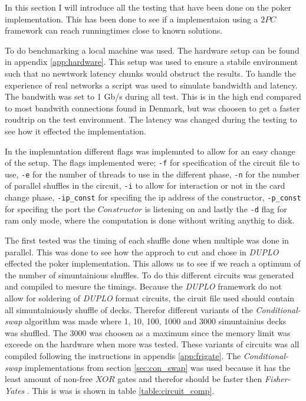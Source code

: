 \documentclass[twoside,11pt,openright]{report}
\newcommand{\FY}{\textit{Fisher-Yates} }
\newcommand{\CS}{\textit{Conditional-swap} }
\newcommand{\DUPLO}{\textit{DUPLO} }
\begin{document}
In this section I will introduce all the testing that have been done on the poker implementation. This has been done to see if a implementaion using a $2PC$ framework can reach runningtimes close to known solutions.

To do benchmarking a local machine was used. The hardware setup can be found in appendix \ref{app:hardware}. This setup was used to ensure a stabile environment such that no newtwork latency chunks would obstruct the results. To handle the experience of real networks a script was used to simulate bandwidth and latency. The bandwith was set to 1 Gb/s during all test. This is in the high end compared to most bandwith connections found in Denmark, but was choosen to get a faster roudtrip on the test environment. The latency was changed during the testing to see how it effected the implementation.

In the implemntation different flags was implemnted to allow for an easy change of the setup. The flags implemented were; \verb|-f| for specification of the circuit file to use, \verb|-e| for the number of threads to use in the different phase, \verb|-n| for the number of parallel shuffles in the circuit, \verb|-i| to allow for interaction or not in the card change phase, \verb|-ip_const| for specifing the ip address of the constructor, \verb|-p_const| for specifing the port the $Constructor$ is listening on and lastly the \verb|-d| flag for ram only mode, where the computation is done without writing anythig to disk.

\bigskip

The first tested was the timing of each shuffle done when multiple was done in parallel. This was done to see how the approch to cut and chose in \DUPLO effected the poker implementation. This allows us to see if we reach a optimum of the number of simuntainious shuffles. To do this different circuits was generated and compiled to mesure the timings. Because the \DUPLO framework do not allow for soldering of \DUPLO format circuits, the ciruit file used should contain all simuntainiously shuffle of decks. Therefor different variants of the \CS algorithm was made where 1, 10, 100, 1000 and 3000 simuntainius decks was shuffled. The 3000 was choosen as a maximum since the memory limit was exceede on the hardware when more was tested. These variants of circuits was all compiled following the instructions in appendis \ref{app:frigate}. The \CS implementations from section \ref{sec:con_swap} was used because it has the least amount of non-free $XOR$ gates and therefor should be faster then \FY . This is was is shown in table \ref{table:circuit_comp}.
\end{document}
